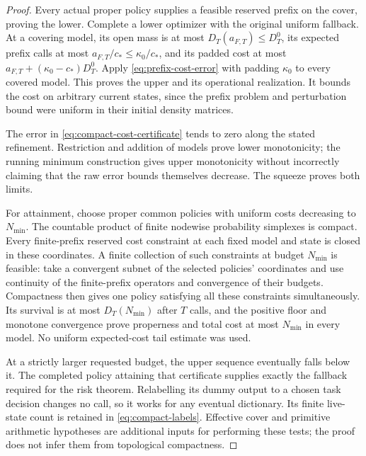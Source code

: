 \begin{proof}
Every actual proper policy supplies a feasible reserved prefix on the cover, proving the lower. Complete a lower optimizer with the original uniform fallback. At a covering model, its open mass is at most $D_T(a_{F,T})\le D_T^0$, its expected prefix calls at most $a_{F,T}/c_*\le\kappa_0/c_*$, and its padded cost at most $a_{F,T}+(\kappa_0-c_*)D_T^0$. Apply \eqref{eq:prefix-cost-error} with padding $\kappa_0$ to every covered model. This proves the upper and its operational realization. It bounds the cost on arbitrary current states, since the prefix problem and perturbation bound were uniform in their initial density matrices.

The error in \eqref{eq:compact-cost-certificate} tends to zero along the stated refinement. Restriction and addition of models prove lower monotonicity; the running minimum construction gives upper monotonicity without incorrectly claiming that the raw error bounds themselves decrease. The squeeze proves both limits.

For attainment, choose proper common policies with uniform costs decreasing to $N_{\min}$. The countable product of finite nodewise probability simplexes is compact. Every finite-prefix reserved cost constraint at each fixed model and state is closed in these coordinates. A finite collection of such constraints at budget $N_{\min}$ is feasible: take a convergent subnet of the selected policies' coordinates and use continuity of the finite-prefix operators and convergence of their budgets. Compactness then gives one policy satisfying all these constraints simultaneously. Its survival is at most $D_T(N_{\min})$ after $T$ calls, and the positive floor and monotone convergence prove properness and total cost at most $N_{\min}$ in every model. No uniform expected-cost tail estimate was used.

At a strictly larger requested budget, the upper sequence eventually falls below it. The completed policy attaining that certificate supplies exactly the fallback required for the risk theorem. Relabelling its dummy output to a chosen task decision changes no call, so it works for any eventual dictionary. Its finite live-state count is retained in \eqref{eq:compact-labels}. Effective cover and primitive arithmetic hypotheses are additional inputs for performing these tests; the proof does not infer them from topological compactness.
\end{proof}

